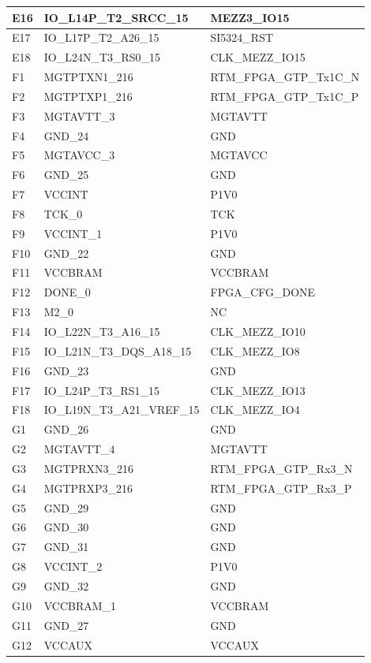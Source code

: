 \begin{footnotesize}
\begin{longtable}{|l|p{6cm}|p{6cm}|}
E16	&	IO\_L14P\_T2\_SRCC\_15	&	MEZZ3\_IO15	\\ \hline
E17	&	IO\_L17P\_T2\_A26\_15	&	SI5324\_RST	\\ \hline
E18	&	IO\_L24N\_T3\_RS0\_15	&	CLK\_MEZZ\_IO15	\\ \hline
F1	&	MGTPTXN1\_216	&	RTM\_FPGA\_GTP\_Tx1C\_N	\\ \hline
F2	&	MGTPTXP1\_216	&	RTM\_FPGA\_GTP\_Tx1C\_P	\\ \hline
F3	&	MGTAVTT\_3	&	MGTAVTT	\\ \hline
F4	&	GND\_24	&	GND	\\ \hline
F5	&	MGTAVCC\_3	&	MGTAVCC	\\ \hline
F6	&	GND\_25	&	GND	\\ \hline
F7	&	VCCINT	&	P1V0	\\ \hline
F8	&	TCK\_0	&	TCK	\\ \hline
F9	&	VCCINT\_1	&	P1V0	\\ \hline
F10	&	GND\_22	&	GND	\\ \hline
F11	&	VCCBRAM	&	VCCBRAM	\\ \hline
F12	&	DONE\_0	&	FPGA\_CFG\_DONE	\\ \hline
F13	&	M2\_0	&	NC	\\ \hline
F14	&	IO\_L22N\_T3\_A16\_15	&	CLK\_MEZZ\_IO10	\\ \hline
F15	&	IO\_L21N\_T3\_DQS\_A18\_15	&	CLK\_MEZZ\_IO8	\\ \hline
F16	&	GND\_23	&	GND	\\ \hline
F17	&	IO\_L24P\_T3\_RS1\_15	&	CLK\_MEZZ\_IO13	\\ \hline
F18	&	IO\_L19N\_T3\_A21\_VREF\_15	&	CLK\_MEZZ\_IO4	\\ \hline
G1	&	GND\_26	&	GND	\\ \hline
G2	&	MGTAVTT\_4	&	MGTAVTT	\\ \hline
G3	&	MGTPRXN3\_216	&	RTM\_FPGA\_GTP\_Rx3\_N	\\ \hline
G4	&	MGTPRXP3\_216	&	RTM\_FPGA\_GTP\_Rx3\_P	\\ \hline
G5	&	GND\_29	&	GND	\\ \hline
G6	&	GND\_30	&	GND	\\ \hline
G7	&	GND\_31	&	GND	\\ \hline
G8	&	VCCINT\_2	&	P1V0	\\ \hline
G9	&	GND\_32	&	GND	\\ \hline
G10	&	VCCBRAM\_1	&	VCCBRAM	\\ \hline
G11	&	GND\_27	&	GND	\\ \hline
G12	&	VCCAUX	&	VCCAUX	\\ \hline

\end{longtable}
\end{footnotesize}
